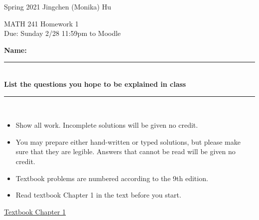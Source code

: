 \documentclass[11pt]{article}
\begin{document}
\enlargethispage{\baselineskip}

Spring 2021 \hfill Jingchen (Monika) Hu\\

\begin{center}
{\huge MATH 241 Homework 1}	\\
Due: Sunday 2/28 11:59pm to Moodle
\end{center}
\vspace{0.5cm}

\textbf{Name:} \rule{6cm}{0.5pt}\\
\textbf{List the questions you hope to be explained in class} \rule{3cm}{0.5pt}	 \\


{\bf
\begin{itemize}
\item Show all work. Incomplete solutions will be given no credit.
\item You may prepare either hand-written or typed solutions, but please make sure that they are legible.
Answers that cannot be read will be given no credit.
\item Textbook problems are numbered according to the 9th edition.
\item Read textbook Chapter 1 in the text before you start.

\end{itemize}
}

\underline{Textbook  Chapter 1   }
\end{document}
